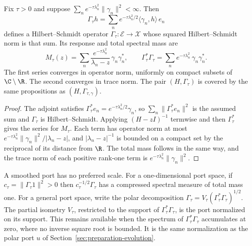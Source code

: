 \begin{proposition}
\label{prop:passive-heat-discrete}
Fix $\tau>0$ and suppose $\sum_{n}e^{-\tau\lambda_n^2}\|\gamma_n\|^2<\infty$. Then
\begin{equation}
 \Gamma_\tau h=\sum_ne^{-\tau\lambda_n^2/2}\langle\gamma_n,h\rangle\,e_n
 \label{eq:passive-heat-discrete-port}
\end{equation}
defines a Hilbert--Schmidt operator $\Gamma_\tau:\mathcal E\to\mathcal X$ whose squared Hilbert--Schmidt norm is that sum. Its response and total spectral mass are
\begin{equation}
 M_\tau(z)=\sum_n\frac{e^{-\tau\lambda_n^2}}{\lambda_n-z}\,\gamma_n\gamma_n^* ,\qquad
 \Gamma_\tau^*\Gamma_\tau=\sum_ne^{-\tau\lambda_n^2}\,\gamma_n\gamma_n^* .
 \label{eq:passive-heat-discrete-response}
\end{equation}
The first series converges in operator norm, uniformly on compact subsets of $\C\setminus\R$. The second converges in trace norm. The pair $(H,\Gamma_\tau)$ is covered by the same propositions as $(H,\Gamma_{\tau,\gamma})$.
\end{proposition}
\begin{proof}
The adjoint satisfies $\Gamma_\tau^*e_n=e^{-\tau\lambda_n^2/2}\gamma_n$, so $\sum_n\|\Gamma_\tau^*e_n\|^2$ is the assumed sum and $\Gamma_\tau$ is Hilbert--Schmidt. Applying $(H-zI)^{-1}$ termwise and then $\Gamma_\tau^*$ gives the series for $M_\tau$. Each term has operator norm at most $e^{-\tau\lambda_n^2}\|\gamma_n\|^2/|\lambda_n-z|$, and $|\lambda_n-z|^{-1}$ is bounded on a compact set by the reciprocal of its distance from $\R$. The total mass follows in the same way, and the trace norm of each positive rank-one term is $e^{-\tau\lambda_n^2}\|\gamma_n\|^2$.
\end{proof}

A smoothed port has no preferred scale. For a one-dimensional port space, if $c_\tau=\|\Gamma_\tau1\|^2>0$ then $c_\tau^{-1/2}\Gamma_\tau$ has a compressed spectral measure of total mass one. For a general port space, write the polar decomposition $\Gamma_\tau=V_\tau(\Gamma_\tau^*\Gamma_\tau)^{1/2}$. The partial isometry $V_\tau$, restricted to the support of $\Gamma_\tau^*\Gamma_\tau$, is the port normalized on its support. This remains available when the spectrum of $\Gamma_\tau^*\Gamma_\tau$ accumulates at zero, where no inverse square root is bounded. It is the same normalization as the polar port $u$ of Section~\ref{sec:preparation-evolution}.
